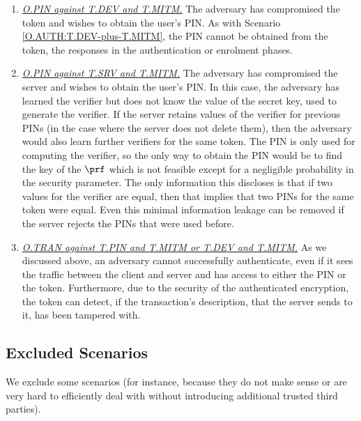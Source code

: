 \begin{enumerate}[leftmargin=5.5mm]
\item\underline{\textit{O.PIN against T.DEV and  T.MITM.}}
The adversary has compromised the token and wishes to obtain the user's PIN. As with Scenario \ref{O.AUTH:T.DEV-plus-T.MITM}, the PIN cannot be obtained from the token, the responses in the authentication or enrolment phases.

\item\underline{\textit{O.PIN against T.SRV and T.MITM.}}
\label{sec:servercompromise}
The adversary has compromised the server and wishes to obtain the user's PIN.
In this case, the adversary has learned the verifier but does not know the value of the secret key, used to generate the verifier. If the server retains values of the verifier for previous PINs (in the case where the server does not delete them), then the adversary would also learn further verifiers for the same token. The PIN is only used for computing the verifier, so the only way to obtain the PIN would be to find the key of the $\prf$ which is not feasible except for a negligible probability in the security parameter. The only information this discloses is that if two values for the verifier are equal, then that implies that two PINs for the same token were equal. Even this minimal information leakage can be removed if the server rejects the PINs that were used before. 

\item\underline{\textit{O.TRAN against T.PIN and T.MITM or T.DEV and T.MITM.}} As we discussed above, an adversary cannot successfully authenticate, even if it sees the traffic between the client and server and has access to either the PIN or the token. Furthermore, due to the security of the authenticated encryption, the token can detect, if the transaction's description, that the server sends to it, has been tampered with. 
 
\end{enumerate}

\subsection{Excluded Scenarios}

We exclude some scenarios (for instance, because they do not make sense or are very hard to efficiently deal with without introducing additional trusted third parties). 


